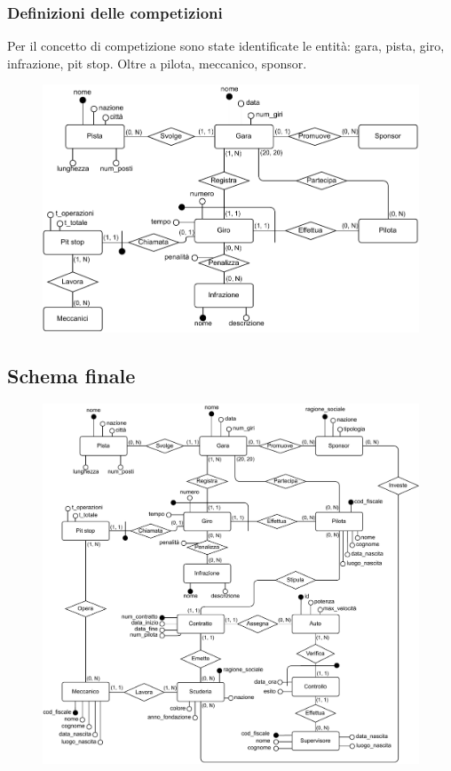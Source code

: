 \documentclass[11pt]{article}
\begin{document}
\subsubsection{Definizioni delle competizioni}
Per il concetto di competizione sono state identificate le entità: gara, pista, giro, infrazione, pit stop. Oltre a pilota, meccanico, sponsor.
\begin{figure}[H]
    \centering
    \includegraphics[width=15.5cm]{../er/gare_gara.pdf} %
\end{figure}

\subsection{Schema finale}
\begin{figure}[H]
    \centering
    \includegraphics[width=15.5cm]{../er/gare.pdf}
\end{figure}
\end{document}
